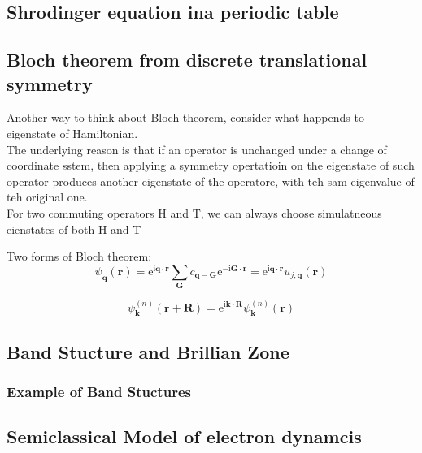 \documentclass[12pt,a4paper]{article}
\begin{document}
\subsection{Shrodinger equation ina periodic table}
\subsection{Bloch theorem from discrete translational symmetry}
Another way to think about Bloch theorem, consider what happends to eigenstate of Hamiltonian.\\ 

The underlying reason is that if an operator is unchanged under a change of coordinate sstem, then applying a symmetry opertatioin on the eigenstate of such operator produces another eigenstate of the operatore, with teh sam eigenvalue of teh original one.\\

For two commuting operators H and T, we can always choose simulatneous eienstates of both H and T 

Two forms of Bloch theorem:
$$
\psi_{\boldsymbol{q}}(\boldsymbol{r})=\mathrm{e}^{\mathrm{i} \boldsymbol{q} \cdot \boldsymbol{r}} \sum_{\boldsymbol{G}} c_{\boldsymbol{q}-\boldsymbol{G}} \mathrm{e}^{-\mathrm{i} \boldsymbol{G} \cdot \boldsymbol{r}}=\mathrm{e}^{\mathrm{i} \boldsymbol{q} \cdot \boldsymbol{r}} u_{j, \boldsymbol{q}}(\boldsymbol{r})
$$            

$$
\psi_{\boldsymbol{k}}^{(n)}(\boldsymbol{r}+\boldsymbol{R})=\mathrm{e}^{\mathrm{i} \boldsymbol{k} \cdot \boldsymbol{R}} \psi_{\boldsymbol{k}}^{(n)}(\boldsymbol{r})
$$      
\subsection{Band Stucture and Brillian Zone}
\subsubsection{Example of Band Stuctures}    
\subsection{Semiclassical Model of electron dynamcis}
\end{document}
